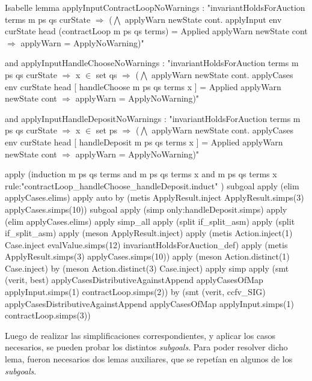 \documentclass[12pt]{book}
\begin{document}
\begin{code}[title=Ausencia de \textit{warnings} durante \textit{applyInput}.]{Isabelle}
lemma applyInputContractLoopNoWarnings : "invariantHoldsForAuction terms m ps qs curState $\Rightarrow$ ($\bigwedge$ applyWarn newState cont. applyInput env curState head (contractLoop m ps qs terms) = Applied applyWarn newState cont $\Rightarrow$ applyWarn = ApplyNoWarning)"

  and applyInputHandleChooseNoWarnings : "invariantHoldsForAuction terms m ps qs curState $\Rightarrow$ x $\in$ set qs $\Rightarrow$ ($\bigwedge$ applyWarn newState cont. applyCases env curState head [ handleChoose m ps qs terms x ] = Applied applyWarn newState cont $\Rightarrow$ applyWarn = ApplyNoWarning)"

 and applyInputHandleDepositNoWarnings : "invariantHoldsForAuction terms m ps qs curState $\Rightarrow$ x $\in$ set ps $\Rightarrow$ ($\bigwedge$ applyWarn newState cont. applyCases env curState head [ handleDeposit m ps qs terms x ] = Applied applyWarn newState cont $\Rightarrow$ applyWarn = ApplyNoWarning)"

    apply (induction m ps qs terms and m ps qs terms x and m ps qs terms x rule:"contractLoop_handleChoose_handleDeposit.induct" )
  subgoal
    apply (elim applyCases.elims)
             apply auto
    by (metis ApplyResult.inject ApplyResult.simps(3) applyCases.simps(10))
  subgoal
    apply (simp only:handleDeposit.simps)
    apply (elim applyCases.elims)
             apply simp_all
    apply (split if_split_asm)
       apply (split if_split_asm)
        apply (meson ApplyResult.inject)
       apply (metis Action.inject(1) Case.inject evalValue.simps(12) invariantHoldsForAuction_def)
      apply (metis ApplyResult.simps(3) applyCases.simps(10))
     apply (meson Action.distinct(1) Case.inject)
    by (meson Action.distinct(3) Case.inject)
    apply simp
   apply (smt (verit, best) applyCasesDistributiveAgainstAppend applyCasesOfMap applyInput.simps(1) contractLoop.simps(2))
  by (smt (verit, ccfv_SIG) applyCasesDistributiveAgainstAppend applyCasesOfMap applyInput.simps(1) contractLoop.simps(3))
\end{code}


Luego de realizar las simplificaciones correspondientes, y aplicar los casos necesarios, se pueden probar los distintos \textit{subgoals}. Para poder resolver dicho lema, fueron necesarios dos lemas auxiliares, que se repetían en algunos de los \textit{subgoals}.
\end{document}
